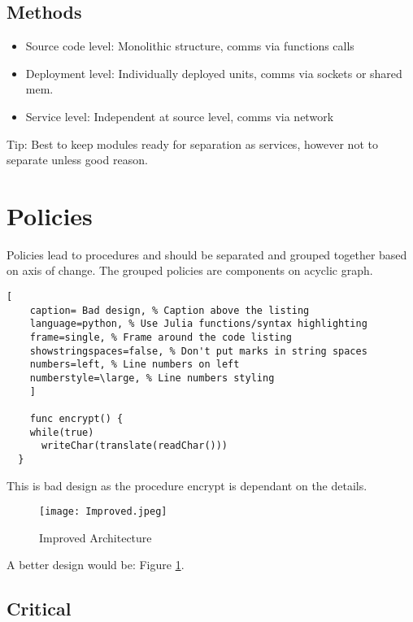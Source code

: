 \documentclass[11pt]{scrartcl} %
\begin{document}
\subsection{Methods}

\begin{itemize}
  \item Source code level: Monolithic structure, comms via functions calls
  \item Deployment level: Individually deployed units, comms via sockets or shared mem.
  \item Service level: Independent at source level, comms via network
\end{itemize}

Tip: Best to keep modules ready for separation as services, however not to separate unless good reason.

\section{Policies}

Policies lead to procedures and should be separated and grouped together based on axis of change.
The grouped policies are components on acyclic graph.

\begin{lstlisting}[
	caption= Bad design, % Caption above the listing
	language=python, % Use Julia functions/syntax highlighting
	frame=single, % Frame around the code listing
	showstringspaces=false, % Don't put marks in string spaces
	numbers=left, % Line numbers on left
	numberstyle=\large, % Line numbers styling
	]

	func encrypt() {
    while(true)
      writeChar(translate(readChar()))
  }

\end{lstlisting}

This is bad design as the procedure encrypt is dependant on the details. \\

\begin{figure}[h] %
	\centering
	\texttt{[image: Improved.jpeg]} %
	\caption{Improved Architecture}
  \label{Improved}
\end{figure}

A better design would be: Figure \ref{Improved}.

\subsection{Critical}
\end{document}
